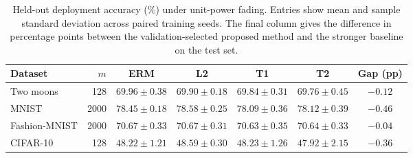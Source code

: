 \begin{table}[htb]
\centering
\caption{Held-out deployment accuracy (\%) under unit-power fading. Entries show mean and sample standard deviation across paired training seeds. The final column gives the difference in percentage points between the validation-selected proposed method and the stronger baseline on the test set.}
\label{tab:unit-power-sweep}
\begin{tabular}{lrccccc}
\toprule
Dataset & $m$ & ERM & L2 & T1 & T2 & Gap (pp) \\
\midrule
Two moons & 128 & $\mathbf{69.96}\pm0.38$ & $69.90\pm0.18$ & $69.84\pm0.31$ & $69.76\pm0.45$ & $-0.12$ \\
MNIST & 2000 & $78.45\pm0.18$ & $\mathbf{78.58}\pm0.25$ & $78.09\pm0.36$ & $78.12\pm0.39$ & $-0.46$ \\
Fashion-MNIST & 2000 & $70.67\pm0.33$ & $\mathbf{70.67}\pm0.31$ & $70.63\pm0.35$ & $70.64\pm0.33$ & $-0.04$ \\
CIFAR-10 & 128 & $48.22\pm1.21$ & $\mathbf{48.59}\pm0.30$ & $48.23\pm1.26$ & $47.92\pm2.15$ & $-0.36$ \\
\bottomrule
\end{tabular}
\end{table}
